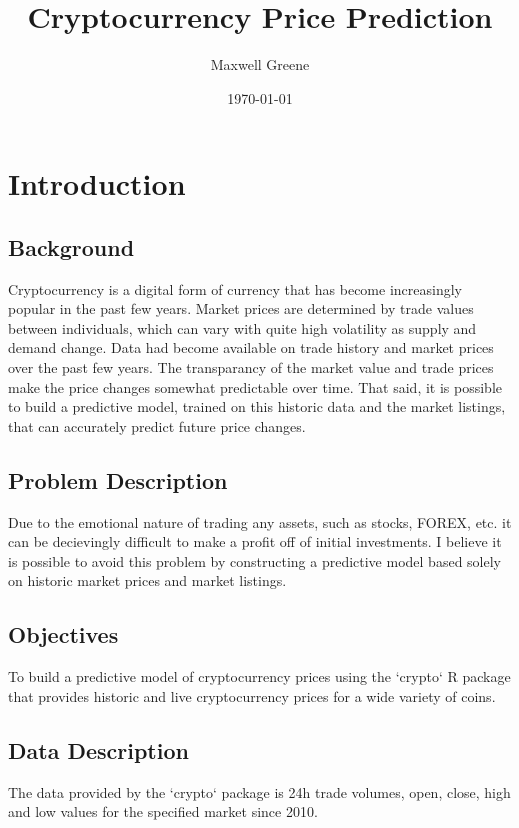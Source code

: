 \documentclass{article}\usepackage[]{graphicx}\usepackage[]{color}
\title{Cryptocurrency Price Prediction}
\author{Maxwell Greene}
\date{\today}
\begin{document}
\maketitle
\begin{abstract}


\end{abstract}

\section{Introduction}
\subsection{Background}
Cryptocurrency is a digital form of currency that has become increasingly popular in the past few years. Market prices are determined by trade values between individuals, which can vary with quite high volatility as supply and demand change. Data had become available on trade history and market prices over the past few years. The transparancy of the market value and trade prices make the price changes somewhat predictable over time. That said, it is possible to build a predictive model, trained on this historic data and the market listings, that can accurately predict future price changes.

\subsection{Problem Description}
Due to the emotional nature of trading any assets, such as stocks, FOREX, etc. it can be decievingly difficult to make a profit off of initial investments. I believe it is possible to avoid this problem by constructing a predictive model based solely on historic market prices and market listings.

\subsection{Objectives}
To build a predictive model of cryptocurrency prices using the `crypto` R package that provides historic and live cryptocurrency prices for a wide variety of coins.

\subsection{Data Description}
The data provided by the `crypto` package is 24h trade volumes, open, close, high and low values for the specified market since 2010.
\end{document}
